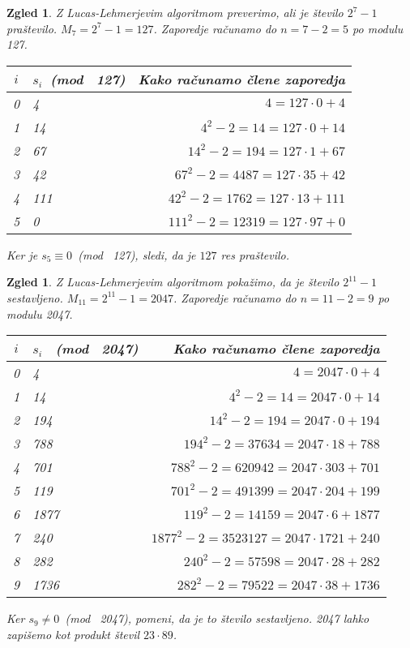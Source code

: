 \documentclass[12pt]{article}
\newtheorem{Zgled}[Izrek]{{\sc Zgled}}
\newenvironment{zgled}{\begin{Zgled}\sl }{\end{Zgled}}
\begin{document}
\begin{zgled}
Z Lucas-Lehmerjevim algoritmom preverimo, ali je število $2^7-1$ praštevilo.
\newline
$M_7=2^7-1=127$. Zaporedje računamo do $n=7-2=5$ po modulu 127.
\newline
\newline
\begin{tabular}{||c|l|r||}
\hline
$i$ & $s_i$\ (mod \ 127) & Kako računamo člene zaporedja \\
\hline
0 & 4 & $4=127\cdot 0+4$ \\
\hline
1 & 14 & $4^2-2=14=127\cdot 0+14$ \\
\hline
2 & 67 & $14^2-2=194=127\cdot 1+67$ \\
\hline
3 & 42 & $67^2-2=4487=127\cdot 35+42$ \\
\hline
4 & 111 & $42^2-2=1762=127\cdot 13+111$ \\
\hline
5 & 0 & $111^2-2=12319=127\cdot 97+0$ \\
\hline
\end{tabular}
\newline
\newline
Ker je $s_5\equiv0$\ (mod \ 127), sledi, da je $127$ res praštevilo.
\end{zgled}
\begin{zgled}
Z Lucas-Lehmerjevim algoritmom pokažimo, da je število $2^{11}-1$ sestavljeno.
\newline
$M_{11}=2^{11}-1=2047$. Zaporedje računamo do $n=11-2=9$ po modulu 2047.
\newline
\newline
\begin{tabular}{||c|l|r||}
\hline
$i$ & $s_i$ \ (mod \ 2047) & Kako računamo člene zaporedja \\
\hline
0 & 4 & $4=2047\cdot 0+4$ \\
\hline
1 & 14 & $4^2-2=14=2047\cdot 0+14$ \\
\hline
2 & 194 & $14^2-2=194=2047\cdot 0+194$ \\
\hline
3 & 788 & $194^2-2=37634=2047\cdot 18+788$ \\
\hline
4 & 701 & $788^2-2=620942=2047\cdot 303+701$ \\
\hline
5 & 119 & $701^2-2=491399=2047\cdot 204+199$ \\
\hline
6 & 1877 & $119^2-2=14159=2047\cdot 6+1877$ \\
\hline
7 & 240 & $1877^2-2=3523127=2047\cdot 1721+240$ \\
\hline
8 & 282 & $ 240^2-2=57598=2047\cdot 28+282$ \\
\hline
9 & 1736 & $282^2-2=79522=2047\cdot 38+1736$ \\
\hline
\end{tabular}
\newline
\newline
Ker $s_9\ne0$\ (mod \ 2047), pomeni, da je to število sestavljeno. 2047 lahko zapišemo kot produkt števil $23\cdot 89$.
\end{zgled}
\newpage
\end{document}
